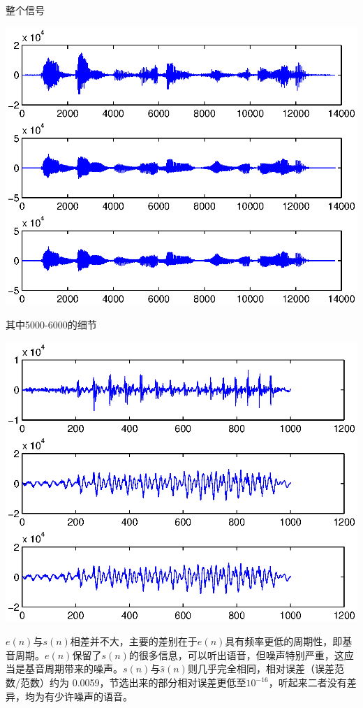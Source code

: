 \section{}
\noindent{}
\par
整个信号
\begin{center}\includegraphics[width=\textwidth]{A2_6_whole.eps}\end{center}
其中5000-6000的细节
\begin{center}\includegraphics[width=\textwidth]{A2_6_detail.eps}\end{center}
$e(n)$与$s(n)$相差并不大，主要的差别在于$e(n)$具有频率更低的周期性，即基音周期。$e(n)$保留了$s(n)$的很多信息，可以听出语音，但噪声特别严重，这应当是基音周期带来的噪声。$s(n)$与$\hat{s}(n)$则几乎完全相同，相对误差（误差范数/范数）约为 0.0059，节选出来的部分相对误差更低至$10^{-16}$，听起来二者没有差异，均为有少许噪声的语音。
